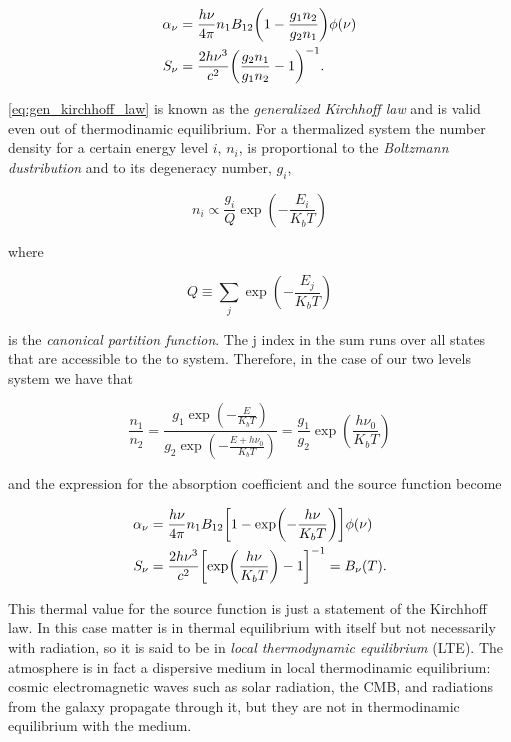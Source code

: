 \begin{align}
        \alpha_\nu & = \frac{h\nu}{4\pi} n_1 B_{12}
        \qty(1 - \frac{g_1 n_2}{g_2 n_1})\phi\qty(\nu)\\
        S_\nu & = \frac{2h\nu^3}{c^2}\qty(\frac{g_2 n_1}{g_1 n_2} - 1)^{-1}.
        \label{eq:gen_kirchhoff_law}
\end{align}

\autoref{eq:gen_kirchhoff_law} is known as the \emph{generalized Kirchhoff
law} and is valid even out of thermodinamic equilibrium. For a thermalized
system the number density for a certain energy level $i$, $n_i$, is
proportional to the \emph{Boltzmann dustribution} and to its degeneracy
number, $g_i$,

\begin{equation}
        n_i \propto \frac{g_i}{Q} \exp(-\frac{E_i}{K_b T})
\end{equation}

where

\begin{equation}
        Q \equiv \sum_j \exp(-\frac{E_j}{K_b T})
\end{equation}

is the \emph{canonical partition function}. The j index in the sum runs
over all states that are accessible to the to system. Therefore, in the
case of our two levels system we have that

\begin{equation}
        \frac{n_1}{n_2} = \frac{g_1 \exp(-\frac{E}{K_b T})}{
        g_2 \exp(-\frac{E + h\nu_0}{K_b T})} =
        \frac{g_1}{g_2} \exp(\frac{h\nu_0}{K_b T})
\end{equation}

and the expression for the absorption coefficient and the source function
become

\begin{align}
        \alpha_\nu & = \frac{h\nu}{4\pi} n_1 B_{12}
        \qty[1 - \exp(-\frac{h\nu}{K_b T})]\phi\qty(\nu)\\
        S_\nu & = \frac{2h\nu^3}{c^2}\qty[\exp(\frac{h\nu}{K_b T}) - 1]^{-1}
        = B_\nu\qty(T).
\end{align}

This thermal value for the source function is just a statement of the
Kirchhoff law. In this case matter is in thermal equilibrium with
itself but not necessarily with radiation, so it is said to be in \emph{local
thermodynamic equilibrium} (LTE). The atmosphere is in fact a dispersive
medium in local thermodinamic equilibrium: cosmic electromagnetic waves
such as solar radiation, the CMB, and radiations from the galaxy propagate
through it, but they are not in thermodinamic equilibrium with the medium.

